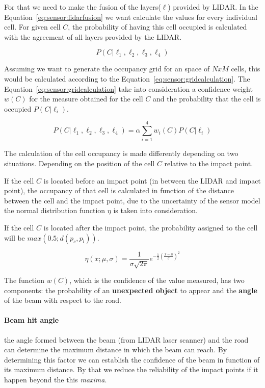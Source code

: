 For that we need to make the fusion of the layers($\ell$) provided by LIDAR. In the Equation~\ref{eq:sensor:lidarfusion} we want calculate the values for every individual cell. For given cell $C$, the probability of having this cell occupied is calculated with the agreement of all layers provided by the LIDAR.

\begin{equation}
\label{eq:sensor:lidarfusion}
P(C|\ell_1,\ell_2,\ell_3,\ell_4)
\end{equation}

Assuming we want to generate the occupancy grid for an space of $NxM$ cells, this would be calculated according to the Equation~\ref{eq:sensor:gridcalculation}. The Equation~\ref{eq:sensor:gridcalculation} take into consideration a confidence weight $w(C)$ for the measure obtained for the cell $C$ and the probability that the cell is occupied $P(C|\ell_i)$.

\begin{equation}
\label{eq:sensor:gridcalculation}
P(C|\ell_1,\ell_2,\ell_3,\ell_4)=\alpha \sum_{i=1}^{4} w_i(C)P(C|\ell_i)
\end{equation}

The calculation of the cell occupancy is made differently depending on two situations. Depending on the position of the cell $C$ relative to the impact point.

If the cell $C$ is located before an impact point (in between the LIDAR and impact point), the occupancy of that cell is calculated in function of the distance between the cell and the impact point, due to the uncertainty of the sensor model the normal distribution function $\eta$ is taken into consideration.

If the cell $C$ is located after the impact point, the probability assigned to the cell will be $max(0.5;d(p_c,p_l))$.

\begin{equation}
\label{eq:sensor:normal}
\eta(x;\mu,\sigma)=\frac{1}{\sigma \sqrt{2\pi}}e^{-\frac{1}{2}(\frac{x-\mu}{\sigma})^2} 
\end{equation}

The function $w(C)$, which is the confidence of the value measured, has two components: the probability of an \textbf{unexpected object} to appear and the \textbf{angle} of the beam with respect to the road.

\paragraph*{Beam hit angle} the angle formed between the beam (from LIDAR laser scanner) and the road can determine the maximum distance in which the beam can reach. By determining this factor we can establish the confidence of the beam in function of its maximum distance. By that we reduce the reliability of the impact points if it happen beyond the this \textit{maxima}. 

